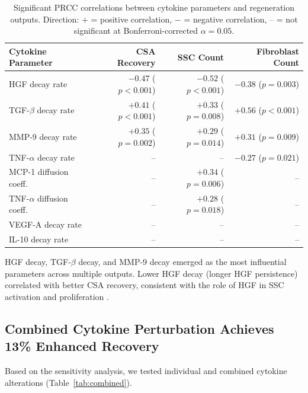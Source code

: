 \documentclass[11pt]{article}
\begin{document}
\begin{table}[H]
\centering
\caption{Significant PRCC correlations between cytokine parameters and regeneration outputs. Direction: $+$ = positive correlation, $-$ = negative correlation, -- = not significant at Bonferroni-corrected $\alpha = 0.05$.}
\label{tab:prcc}
\begin{tabular}{lrrr}
\toprule
\textbf{Cytokine Parameter} & \textbf{CSA Recovery} & \textbf{SSC Count} & \textbf{Fibroblast Count} \\
\midrule
HGF decay rate & $-0.47$ ($p < 0.001$) & $-0.52$ ($p < 0.001$) & $-0.38$ ($p = 0.003$) \\
TGF-$\beta$ decay rate & $+0.41$ ($p < 0.001$) & $+0.33$ ($p = 0.008$) & $+0.56$ ($p < 0.001$) \\
MMP-9 decay rate & $+0.35$ ($p = 0.002$) & $+0.29$ ($p = 0.014$) & $+0.31$ ($p = 0.009$) \\
TNF-$\alpha$ decay rate & -- & -- & $-0.27$ ($p = 0.021$) \\
MCP-1 diffusion coeff. & -- & $+0.34$ ($p = 0.006$) & -- \\
TNF-$\alpha$ diffusion coeff. & -- & $+0.28$ ($p = 0.018$) & -- \\
VEGF-A decay rate & -- & -- & -- \\
IL-10 decay rate & -- & -- & -- \\
\bottomrule
\end{tabular}
\end{table}

HGF decay, TGF-$\beta$ decay, and MMP-9 decay emerged as the most influential parameters across multiple outputs. Lower HGF decay (longer HGF persistence) correlated with better CSA recovery, consistent with the role of HGF in SSC activation and proliferation \citep{tatsumi1998hgf}.

\subsection{Combined Cytokine Perturbation Achieves 13\% Enhanced Recovery}

Based on the sensitivity analysis, we tested individual and combined cytokine alterations (Table~\ref{tab:combined}).
\end{document}
